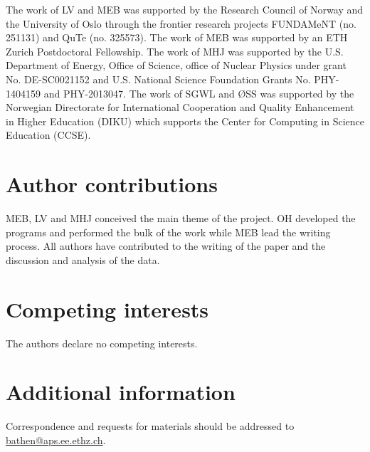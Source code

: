 \documentclass[superscriptaddress,unsortedaddress,
 amsmath,amssymb,
 aps,
]{revtex4-2}
\begin{document}


\begin{acknowledgments}

The work of LV and MEB was supported by the Research Council of Norway and the University of Oslo through the frontier research projects FUNDAMeNT (no. 251131) and QuTe (no. 325573). 
The work of MEB was supported by an ETH Zurich Postdoctoral Fellowship. 
The work of MHJ was supported by the U.S. Department of Energy, 
Office of Science, office of Nuclear Physics under grant 
No. DE-SC0021152 and U.S. National Science Foundation Grants
No. PHY-1404159 and PHY-2013047. 
The work of SGWL and ØSS was supported by the Norwegian Directorate for International Cooperation and Quality Enhancement in Higher Education (DIKU) which supports the Center for Computing in Science Education (CCSE).


\end{acknowledgments}

\section*{Author contributions}
MEB, LV and MHJ conceived the main theme of the project. OH developed the programs and performed the bulk of the work while MEB lead the writing process. All authors have contributed to the writing of the paper and the discussion and analysis of the data.

\section*{Competing interests}
The authors declare no competing interests.

\section*{Additional information}
Correspondence and requests for materials should be addressed to \url{bathen@aps.ee.ethz.ch}. 
\end{document}
